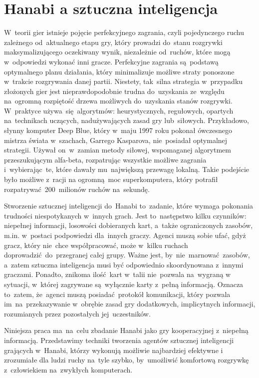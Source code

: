 \documentclass[declaration,shortabstract,inz]{iithesis}
\begin{document}
\section{Hanabi a sztuczna inteligencja}

W~teorii gier istnieje pojęcie perfekcyjnego zagrania, czyli pojedynczego ruchu zależnego od~aktualnego etapu gry, który prowadzi do~stanu rozgrywki maksymalizującego oczekiwany wynik, niezależnie od~ruchów, które mogą w~odpowiedzi wykonać inni gracze. Perfekcyjne zagrania są~podstawą optymalnego planu działania, który minimalizuje możliwe straty ponoszone w~trakcie rozgrywania danej partii. Niestety, tak~silna strategia w~przypadku złożonych gier jest nieprawdopodobnie trudna do~uzyskania ze~względu na~ogromną rozpiętość drzewa możliwych do~uzyskania stanów rozgrywki. W~praktyce używa~się algorytmów: heurystycznych, regułowych, opartych na~technikach uczących, nadużywających zasad gry lub~siłowych. Przykładowo, słynny komputer Deep Blue, który w~maju 1997 roku pokonał ówczesnego mistrza świata w~szachach, Garrego Kasparova, nie~posiadał optymalnej strategii. Używał on~w~zamian metody siłowej, wspomaganej algorytmem przeszukującym alfa-beta, rozpatrując wszystkie możliwe zagrania i~wybierając~te, które dawały mu~największą przewagę lokalną. Takie podejście było możliwe z~racji na ogromną moc superkomputera, który potrafił rozpatrywać 200~milionów ruchów na~sekundę.

Stworzenie sztucznej inteligencji do~Hanabi to~zadanie, które wymaga pokonania trudności niespotykanych w~innych grach. Jest to~następstwo kilku czynników: niepełnej informacji, losowości dobieranych kart, a~także ograniczonych zasobów, m.in. w~postaci podpowiedzi dla~innych graczy. Agenci muszą sobie ufać, gdyż gracz, który nie~chce współpracować, może w~kilku ruchach doprowadzić do~przegranej całej grupy. Ważne jest, by~nie~marnować zasobów, a~zatem sztuczna inteligencja musi być odpowiednio skoordynowana z~innymi graczami. Ponadto, znikoma ilość kart w~talii nie~pozwala na~wygraną w sytuacji, w~której zagrywane są~wyłącznie karty z~pełną informacją. Oznacza to~zatem, że~agenci muszą posiadać protokół komunikacji, który pozwala im~na~przekazywanie w~obrębie zasad gry dodatkowych, implicytnych informacji, rozumianych przez pozostałych jej~uczestników.

Niniejsza praca ma~na~celu zbadanie Hanabi jako gry kooperacyjnej z~niepełną informacją. Przedstawimy techniki tworzenia agentów sztucznej inteligencji grających w~Hanabi, którzy wykonują możliwie najbardziej efektywne i zrozumiałe dla ludzi ruchy na~tyle szybko, by~umożliwić komfortową rozgrywkę z~człowiekiem na~zwykłych komputerach.
\end{document}
